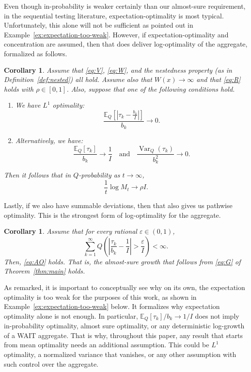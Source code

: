 \documentclass{article}
\newcommand{\EE}{\mathbb E}
\newtheorem{corollary}[theorem]{Corollary}
\theoremstyle{definition}
\begin{document}
Even though in-probability is weaker certainly than our almost-sure requirement, in the sequential testing literature, expectation-optimality is most typical. Unfortunately, this alone will not be sufficient as pointed out in Example~\ref{ex:expectation-too-weak}. However, if expectation-optimality and concentration are assumed, then that does deliver log-optimality of the aggregate, formalized as follows.

\begin{corollary}\label{cor:expectation-plus-concentration}
Assume that \eqref{eq:V}, \eqref{eq:W}, and the nestedness property (as in Definition~\ref{def:nested}) all hold. Assume also that $W(x)\to\infty$ and that \eqref{eq:R} holds with $\rho\in[0,1]$. Also, suppose that one of the following conditions hold.
\begin{enumerate}
    \item We have $L^1$ optimality:
    \[
    \frac{\EE_Q\left[\left|\tau_k-\frac{b_k}{I}\right|\right]}{b_k}\longrightarrow 0.
    \]
    \item Alternatively, we have:
    \[
    \frac{\EE_Q[\tau_k]}{b_k}\longrightarrow\frac{1}{I}\quad\text{and}\quad \frac{\operatorname{Var}_Q(\tau_k)}{b_k^2}\longrightarrow 0.
    \]
\end{enumerate}
Then it follows that in $Q$-probability as $t\to\infty$,
\[
\frac{1}{t}\log M_t\longrightarrow\rho I.
\]
\end{corollary}

Lastly, if we also have summable deviations, then that also gives us pathwise optimality. This is the strongest form of log-optimality for the aggregate.

\begin{corollary}\label{cor:summable-deviations}
Assume that for every rational $\varepsilon\in(0,1)$,
\[
\sum_{k=1}^\infty Q\left(\left|\frac{\tau_k}{b_k}-\frac{1}{I}\right|>\frac{\varepsilon}{I}\right)<\infty.
\]
Then, \eqref{eq:AO} holds. That is, the almost-sure growth that follows from \eqref{eq:G} of Theorem~\ref{thm:main} holds.
\end{corollary}

As remarked, it is important to conceptually see why on its own, the expectation optimality is too weak for the purposes of this work, as shown in Example~\ref{ex:expectation-too-weak} below. It formalizes why expectation optimality alone is not enough. In particular, $\EE_Q[\tau_k]/b_k\to 1/I$ does not imply in-probability optimality, almost sure optimality, or any deterministic log-growth of a WAIT aggregate. That is why, throughout this paper, any result that starts from mean optimality needs an additional assumption. This could be $L^{1}$ optimality, a normalized variance that vanishes, or any other assumption with such control over the aggregate.
\end{document}
